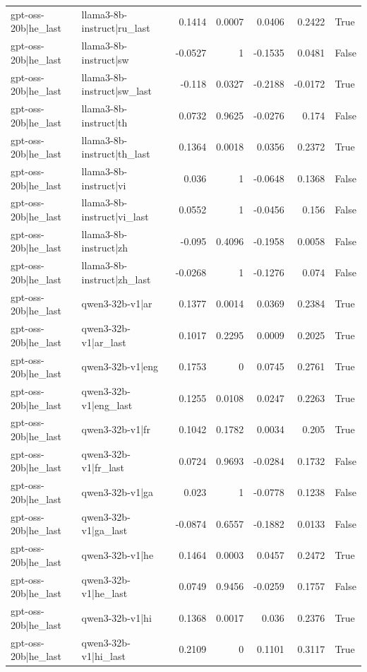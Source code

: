 \begin{table}
\begin{tabular}{l l r r r r l}
gpt-oss-20b|he_last & llama3-8b-instruct|ru_last & 0.1414 & 0.0007 & 0.0406 & 0.2422 & True \\
gpt-oss-20b|he_last & llama3-8b-instruct|sw & -0.0527 & 1 & -0.1535 & 0.0481 & False \\
gpt-oss-20b|he_last & llama3-8b-instruct|sw_last & -0.118 & 0.0327 & -0.2188 & -0.0172 & True \\
gpt-oss-20b|he_last & llama3-8b-instruct|th & 0.0732 & 0.9625 & -0.0276 & 0.174 & False \\
gpt-oss-20b|he_last & llama3-8b-instruct|th_last & 0.1364 & 0.0018 & 0.0356 & 0.2372 & True \\
gpt-oss-20b|he_last & llama3-8b-instruct|vi & 0.036 & 1 & -0.0648 & 0.1368 & False \\
gpt-oss-20b|he_last & llama3-8b-instruct|vi_last & 0.0552 & 1 & -0.0456 & 0.156 & False \\
gpt-oss-20b|he_last & llama3-8b-instruct|zh & -0.095 & 0.4096 & -0.1958 & 0.0058 & False \\
gpt-oss-20b|he_last & llama3-8b-instruct|zh_last & -0.0268 & 1 & -0.1276 & 0.074 & False \\
gpt-oss-20b|he_last & qwen3-32b-v1|ar & 0.1377 & 0.0014 & 0.0369 & 0.2384 & True \\
gpt-oss-20b|he_last & qwen3-32b-v1|ar_last & 0.1017 & 0.2295 & 0.0009 & 0.2025 & True \\
gpt-oss-20b|he_last & qwen3-32b-v1|eng & 0.1753 & 0 & 0.0745 & 0.2761 & True \\
gpt-oss-20b|he_last & qwen3-32b-v1|eng_last & 0.1255 & 0.0108 & 0.0247 & 0.2263 & True \\
gpt-oss-20b|he_last & qwen3-32b-v1|fr & 0.1042 & 0.1782 & 0.0034 & 0.205 & True \\
gpt-oss-20b|he_last & qwen3-32b-v1|fr_last & 0.0724 & 0.9693 & -0.0284 & 0.1732 & False \\
gpt-oss-20b|he_last & qwen3-32b-v1|ga & 0.023 & 1 & -0.0778 & 0.1238 & False \\
gpt-oss-20b|he_last & qwen3-32b-v1|ga_last & -0.0874 & 0.6557 & -0.1882 & 0.0133 & False \\
gpt-oss-20b|he_last & qwen3-32b-v1|he & 0.1464 & 0.0003 & 0.0457 & 0.2472 & True \\
gpt-oss-20b|he_last & qwen3-32b-v1|he_last & 0.0749 & 0.9456 & -0.0259 & 0.1757 & False \\
gpt-oss-20b|he_last & qwen3-32b-v1|hi & 0.1368 & 0.0017 & 0.036 & 0.2376 & True \\
gpt-oss-20b|he_last & qwen3-32b-v1|hi_last & 0.2109 & 0 & 0.1101 & 0.3117 & True \\

\end{tabular}
\end{table}

